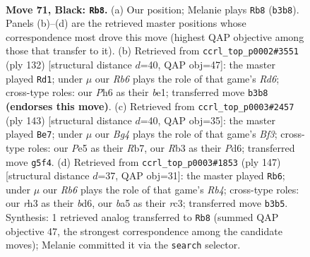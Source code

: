 \documentclass[11pt]{article}
\begin{document}
\clearpage

\begin{figure}[p]\centering
\begin{subfigure}{0.46\textwidth}\centering
\resizebox{\linewidth}{!}{%
\newchessgame
\chessboard[
  setfen={8/8/B2p1k1p/B3p1b1/n3P2p/1r3P1R/4K3/8 b - - 12 71},
  showmover=false,
  pgfstyle=straightmove, color=movearrow, markmove={b3-b8}
]}
\caption{}
\end{subfigure}\hfill
\begin{subfigure}{0.46\textwidth}\centering
\resizebox{\linewidth}{!}{%
\newchessgame
\chessboard[
  setfen={8/8/3R2pk/7p/7P/4rPPK/6B1/4b3 w - - 6 67},
  showmover=false,
  pgfstyle=straightmove, color=movearrow, markmove={d6-d1}
]}
\caption{}
\end{subfigure}
\\[4pt]
\begin{subfigure}{0.46\textwidth}\centering
\resizebox{\linewidth}{!}{%
\newchessgame
\chessboard[
  setfen={8/1r4k1/3pPb2/3P4/1pR3K1/1Pp5/2B5/8 b - - 15 72},
  showmover=false,
  pgfstyle=straightmove, color=movearrow, markmove={f6-e7}
]}
\caption{}
\end{subfigure}\hfill
\begin{subfigure}{0.46\textwidth}\centering
\resizebox{\linewidth}{!}{%
\newchessgame
\chessboard[
  setfen={8/r4p1k/P2B2b1/1r2p1Pp/7P/2R5/5K2/R7 b - - 84 74},
  showmover=false,
  pgfstyle=straightmove, color=movearrow, markmove={b5-b6}
]}
\caption{}
\end{subfigure}
\caption{\textbf{Move 71, Black: \texttt{Rb8}.} (a) Our position; Melanie plays \texttt{Rb8} (\texttt{b3b8}). Panels (b)--(d) are the retrieved master positions whose correspondence most drove this move (highest QAP objective among those that transfer to it). (b) Retrieved from \texttt{ccrl\_top\_p0002\#3551} (ply 132) [structural distance $d$=40, QAP obj=47]: the master played \texttt{Rd1}; under $\mu$ our \emph{Rb6} plays the role of that game's \emph{Rd6}; cross-type roles: our \emph{P}h6 as their \emph{b}e1; transferred move \texttt{b3b8} \textbf{(endorses this move)}. (c) Retrieved from \texttt{ccrl\_top\_p0003\#2457} (ply 143) [structural distance $d$=40, QAP obj=35]: the master played \texttt{Be7}; under $\mu$ our \emph{Bg4} plays the role of that game's \emph{Bf3}; cross-type roles: our \emph{P}e5 as their \emph{R}b7, our \emph{R}b3 as their \emph{P}d6; transferred move \texttt{g5f4}. (d) Retrieved from \texttt{ccrl\_top\_p0003\#1853} (ply 147) [structural distance $d$=37, QAP obj=31]: the master played \texttt{Rb6}; under $\mu$ our \emph{Rb6} plays the role of that game's \emph{Rb4}; cross-type roles: our \emph{r}h3 as their \emph{b}d6, our \emph{b}a5 as their \emph{r}c3; transferred move \texttt{b3b5}. Synthesis: 1 retrieved analog transferred to \texttt{Rb8} (summed QAP objective 47, the strongest correspondence among the candidate moves); Melanie committed it via the \texttt{search} selector.}
\label{fig:thought-m141}
\end{figure}
\end{document}
